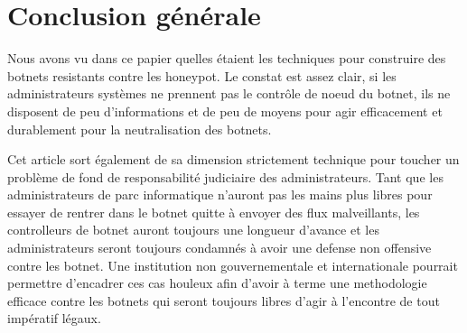 \chapter*{Conclusion générale}


Nous avons vu dans ce papier quelles étaient les techniques pour construire
des botnets resistants contre les honeypot. Le constat est assez clair, si
les administrateurs systèmes ne prennent pas le contrôle de noeud du botnet,
ils ne disposent de peu d'informations et de peu de moyens pour agir efficacement
et durablement pour la neutralisation des botnets.

Cet article sort également de sa dimension strictement technique pour toucher
un problème de fond de responsabilité judiciaire des administrateurs. Tant
que les administrateurs de parc informatique n'auront pas les mains plus libres
pour essayer de rentrer dans le botnet quitte à envoyer des flux malveillants, les
controlleurs de botnet auront toujours une longueur d'avance et les administrateurs
seront toujours condamnés à avoir une defense non offensive contre les botnet. Une
institution non gouvernementale et internationale pourrait permettre d'encadrer ces
cas houleux afin d'avoir à terme une methodologie efficace contre les botnets qui seront
toujours libres d'agir à l'encontre de tout impératif légaux.
